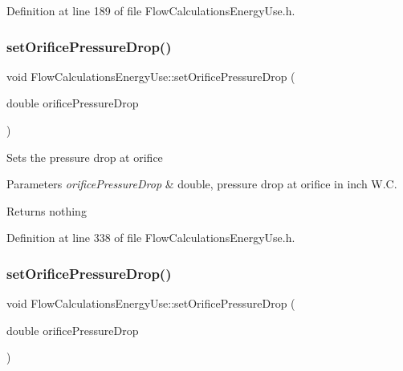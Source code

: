 Definition at line 189 of file Flow\+Calculations\+Energy\+Use.\+h.

\mbox{\label{class_flow_calculations_energy_use_ad4b324ecd8288d44c32d622bb26b1bff}} 
\subsubsection{\texorpdfstring{set\+Orifice\+Pressure\+Drop()}{setOrificePressureDrop()}\hspace{0.1cm}{\footnotesize\ttfamily [1/3]}}
{\footnotesize\ttfamily void Flow\+Calculations\+Energy\+Use\+::set\+Orifice\+Pressure\+Drop (\begin{DoxyParamCaption}\item[{double}]{orifice\+Pressure\+Drop }\end{DoxyParamCaption})\hspace{0.3cm}{\ttfamily [inline]}}

Sets the pressure drop at orifice


\begin{DoxyParams}{Parameters}
{\em orifice\+Pressure\+Drop} & double, pressure drop at orifice in inch W.\+C.\\
\hline
\end{DoxyParams}
\begin{DoxyReturn}{Returns}
nothing 
\end{DoxyReturn}


Definition at line 338 of file Flow\+Calculations\+Energy\+Use.\+h.

\mbox{\label{class_flow_calculations_energy_use_ad4b324ecd8288d44c32d622bb26b1bff}} 
\subsubsection{\texorpdfstring{set\+Orifice\+Pressure\+Drop()}{setOrificePressureDrop()}\hspace{0.1cm}{\footnotesize\ttfamily [2/3]}}
{\footnotesize\ttfamily void Flow\+Calculations\+Energy\+Use\+::set\+Orifice\+Pressure\+Drop (\begin{DoxyParamCaption}\item[{double}]{orifice\+Pressure\+Drop }\end{DoxyParamCaption})\hspace{0.3cm}{\ttfamily [inline]}}

